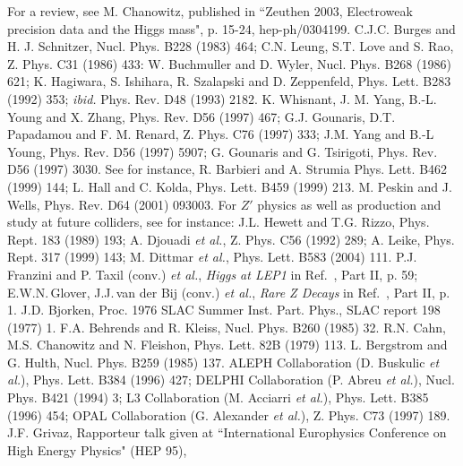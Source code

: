 \begin{thebibliography}{999}
%
 For a review, see M. Chanowitz, published in ``Zeuthen 
2003, Electroweak precision data and the Higgs mass", p. 15-24, 
hep-ph/0304199. 
%
C.J.C. Burges and H. J. Schnitzer, Nucl. Phys. B228 (1983) 464; 
C.N. Leung, S.T. Love and S. Rao, Z. Phys.  C31 (1986) 433:
W. Buchmuller and D. Wyler, Nucl. Phys. B268 (1986) 621;  
K. Hagiwara, S. Ishihara, R. Szalapski and D. Zeppenfeld, 
Phys. Lett. B283 (1992) 353; {\it ibid.} Phys. Rev. D48 (1993) 2182.
%
 K. Whisnant, J. M. Yang, B.-L. Young and X. Zhang,
Phys. Rev. D56 (1997) 467; G.J. Gounaris, D.T. Papadamou and F. M. Renard,
Z. Phys. C76 (1997) 333; J.M. Yang and B.-L Young, Phys. Rev. D56 (1997) 5907;  
G. Gounaris and G. Tsirigoti, Phys. Rev. D56 (1997) 3030. 
%
 See for instance, R. Barbieri and A. Strumia
Phys. Lett. B462 (1999) 144; L. Hall and C. Kolda, Phys. Lett. B459 
(1999) 213.  
%
 M. Peskin and J. Wells, Phys. Rev. D64 (2001)
093003.
%
 For $Z'$ physics as well as production and study at 
future colliders, see for instance: J.L. Hewett and T.G. Rizzo,
Phys. Rept. 183 (1989) 193; A. Djouadi {\it et al.}, Z. Phys. C56 (1992) 289; 
A. Leike, Phys. Rept. 317 (1999) 143; 
M. Dittmar {\it et al.}, Phys. Lett. B583 (2004) 111.    
%
%
 P.J. Franzini and P. Taxil (conv.) {\it et al.}, 
{\it Higgs at LEP1} in Ref.~\cite{Z-Physics}, Part II, p. 59; 
E.W.N.\,Glover, J.J.\,van der Bij (conv.) {\it et al.}, {\it Rare Z Decays} 
in Ref.~\cite{Z-Physics}, Part II, p. 1.
%
 J.D. Bjorken, Proc. 1976 SLAC Summer Inst. Part. 
Phys., SLAC report 198 (1977) 1. 
%
 F.A. Behrends and R. Kleiss, Nucl. Phys. B260 (1985) 
32.
%
 R.N. Cahn, M.S. Chanowitz and N. Fleishon, Phys. Lett.
82B (1979) 113. 
%
 L. Bergstrom and G. Hulth, Nucl. Phys. B259 (1985) 137.
% 
ALEPH Collaboration (D. Buskulic {\it et al.}), Phys. Lett. B384 (1996) 427; 
DELPHI Collaboration (P. Abreu {\it et al.}), Nucl. Phys. B421 (1994) 3;
L3 Collaboration (M. Acciarri {\it et al.}), Phys. Lett. B385 (1996) 454; 
OPAL Collaboration (G. Alexander {\it et al.}), Z. Phys. C73 (1997) 189.
% 
 J.F. Grivaz, Rapporteur talk given at 
``International Europhysics Conference on High Energy Physics" (HEP 95), 

\end{thebibliography}
